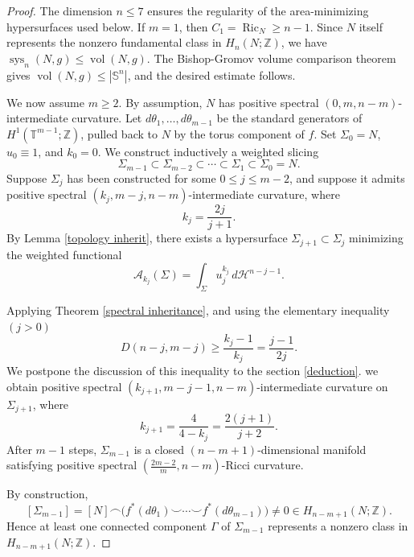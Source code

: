\documentclass[11pt]{amsart}
\DeclareMathOperator{\Ric}{Ric}
\theoremstyle{definition}
\theoremstyle{remark}
\numberwithin{equation}{section}
\begin{document}
\begin{proof}
        The dimension $n\leq 7$ ensures the regularity of the area-minimizing hypersurfaces used
          below. If $m=1$, then $C_1=\Ric_N\geq n-1$. Since $N$ itself represents the nonzero
          fundamental class in $H_n(N;\mathbb{Z})$, we have
          $\operatorname{sys}_n(N,g)\leq \operatorname{vol}(N,g)$. The Bishop-Gromov volume
          comparison theorem gives
          $\operatorname{vol}(N,g)\leq |\mathbb{S}^n|$, and the desired estimate follows.

        We now assume $m\geq 2$. By assumption, $N$ has positive spectral
          $(0,m,n-m)$-intermediate curvature. Let $d\theta_1,\ldots,d\theta_{m-1}$ be the standard
          generators of $H^1(\mathbb{T}^{m-1};\mathbb{Z})$, pulled back to $N$ by the torus
          component of $f$. Set $\Sigma_0=N$, $u_0\equiv 1$, and $k_0=0$. We construct inductively
          a weighted slicing
          \[
              \Sigma_{m-1}\subset \Sigma_{m-2}\subset\cdots\subset \Sigma_1\subset\Sigma_0=N.
          \]
          Suppose $\Sigma_j$ has been constructed for some $0\leq j\leq m-2$, and suppose it
          admits positive spectral $(k_j,m-j,n-m)$-intermediate curvature, where
          \[
              k_j=\frac{2j}{j+1}.
          \]
          By Lemma \ref{topology inherit}, there exists a hypersurface
          $\Sigma_{j+1}\subset \Sigma_j$ minimizing 
          the weighted functional
          \[
              \mathcal{A}_{k_j}(\Sigma)=\int_{\Sigma}u_j^{k_j}\,d\mathcal{H}^{n-j-1}.
          \]
    
          Applying Theorem \ref{spectral inheritance}, and using the elementary inequality $(j>0)$
          \[
              D(n-j,m-j)\geq \frac{k_j-1}{k_j}=\frac{j-1}{2j}.
          \]
           We postpone the discussion of this inequality to the section \ref{deduction}. we obtain positive spectral
          $(k_{j+1},m-j-1,n-m)$-intermediate curvature on $\Sigma_{j+1}$, where
          \[
              k_{j+1}=\frac{4}{4-k_j}=\frac{2(j+1)}{j+2}.
          \]
          After $m-1$ steps, $\Sigma_{m-1}$ is a closed $(n-m+1)$-dimensional manifold satisfying
          positive spectral $(\frac{2m-2}{m},n-m)$-Ricci curvature.

    By construction,
    \[
        [\Sigma_{m-1}]=[N]\frown
        \big(f^*(d\theta_{1})\smile\cdots \smile f^{*}(d\theta_{m-1})\big)
        \neq 0\in H_{n-m+1}(N;\mathbb{Z}).
    \]
    Hence at least one connected component $\Gamma$ of $\Sigma_{m-1}$ represents a nonzero class in
      $H_{n-m+1}(N;\mathbb{Z})$.


\end{proof}
\end{document}
